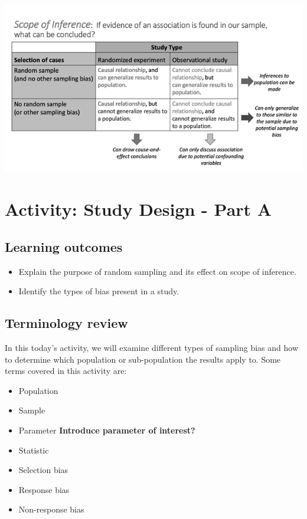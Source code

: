 \documentclass[
]{report}
\begin{document}
\begin{center}\includegraphics[width=0.75\linewidth]{images/ScopeOfInferenceGreyscale} \end{center}

\hypertarget{activity-study-design---part-a}{%
\section{Activity: Study Design - Part A}\label{activity-study-design---part-a}}


\hypertarget{learning-outcomes-2}{%
\subsection{Learning outcomes}\label{learning-outcomes-2}}

\begin{itemize}
\item
  Explain the purpose of random sampling and its effect on scope of inference.
\item
  Identify the types of bias present in a study.
\end{itemize}

\hypertarget{terminology-review-2}{%
\subsection{Terminology review}\label{terminology-review-2}}

In this today's activity, we will examine different types of sampling bias and how to determine which population or sub-population the results apply to. Some terms covered in this activity are:

\begin{itemize}
\item
  Population
\item
  Sample
\item
  Parameter \textbf{Introduce parameter of interest?}
\item
  Statistic
\item
  Selection bias
\item
  Response bias
\item
  Non-response bias
\end{itemize}
\end{document}
